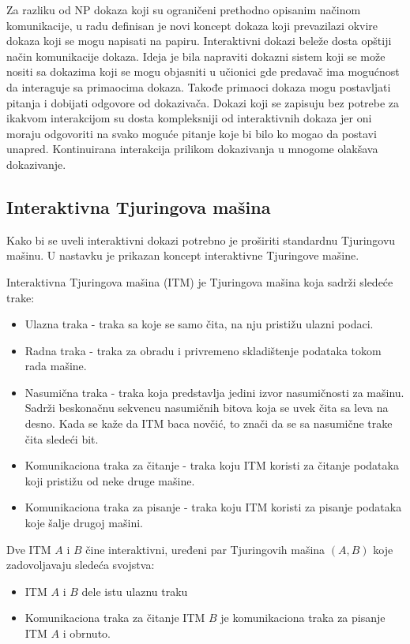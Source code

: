 Za razliku od \textenglish{NP}  dokaza koji su ograni\v ceni prethodno opisanim na\v cinom komunikacije, u radu \cite{mathBook} definisan je novi koncept dokaza koji prevazilazi okvire dokaza koji se mogu napisati na papiru. Interaktivni dokazi bele\v ze dosta op\v stiji na\v cin komunikacije dokaza. Ideja je bila napraviti dokazni sistem koji se mo\v ze nositi sa dokazima koji se mogu objasniti u u\v cionici gde predavač ima mogućnost da interaguje sa primaocima dokaza. Takođe primaoci dokaza mogu postavljati pitanja i dobijati odgovore od dokazivača. Dokazi koji se zapisuju bez potrebe za ikakvom interakcijom su dosta kompleksniji od interaktivnih dokaza jer oni moraju odgovoriti na svako moguće pitanje koje bi bilo ko mogao da postavi unapred. Kontinuirana interakcija prilikom dokazivanja u mnogome olakšava dokazivanje.
\subsection{Interaktivna Tjuringova ma\v sina}


Kako bi se uveli interaktivni dokazi potrebno je proširiti standardnu Tjuringovu mašinu. U nastavku je prikazan koncept interaktivne Tjuringove mašine.
\begin{definition}
	Interaktivna Tjuringova mašina (\textenglish{ITM}) je Tjuringova mašina koja sadrži sledeće trake:
	\begin{itemize}
		\item Ulazna traka - traka sa koje se samo čita, na nju pristižu ulazni podaci.
		\item Radna traka - traka za obradu i privremeno skladištenje podataka tokom rada mašine.
		\item Nasumična traka - traka koja predstavlja jedini izvor nasumičnosti za mašinu. Sadrži beskonačnu sekvencu nasumičnih bitova koja se uvek čita sa leva na desno. Kada se kaže da \textenglish{ITM} baca novčić, to znači da se sa nasumične trake čita sledeći bit.
		\item Komunikaciona traka za čitanje - traka koju \textenglish{ITM} koristi za čitanje podataka koji pristižu od neke druge mašine.
		\item Komunikaciona traka za pisanje - traka koju \textenglish{ITM} koristi za pisanje podataka koje šalje drugoj mašini.
	\end{itemize}
\end{definition}

\begin{definition}
	Dve \textenglish{ITM}  $A$ i $B$  čine interaktivni, uređeni par Tjuringovih ma\v sina $(A,B)$ koje zadovoljavaju slede\' ca svojstva:
	\begin{itemize}
		\item \textenglish{ITM} $A$ i $B$ dele istu ulaznu traku
		\item Komunikaciona traka za čitanje \textenglish{ITM} $B$ je komunikaciona traka za pisanje \textenglish{ITM} $A$ i obrnuto.
	\end{itemize}
\end{definition}

